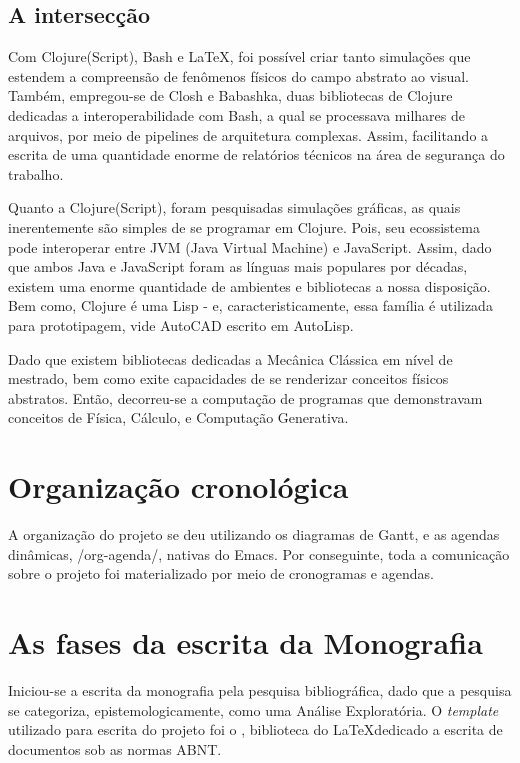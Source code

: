 \documentclass[
12pt,				%
openright,			%
oneside,			%
a4paper,			%
english,			%
french,				%
spanish,			%
brazil,				%
]{abntex2}
\begin{document}
\subsection{A intersecção}

Com Clojure(Script), Bash e \LaTeX{}, foi possível criar tanto
simulações que estendem a compreensão de fenômenos físicos do campo
abstrato ao visual. Também, empregou-se de Closh e Babashka, duas
bibliotecas de Clojure dedicadas a interoperabilidade com Bash, a qual
se processava milhares de arquivos, por meio de pipelines de
arquitetura complexas. Assim, facilitando a escrita de uma quantidade
enorme de relatórios técnicos na área de segurança do trabalho. 

Quanto a Clojure(Script), foram pesquisadas simulações gráficas, as
quais inerentemente são simples de se programar em Clojure. Pois, seu
ecossistema pode interoperar entre JVM (Java Virtual Machine) e
JavaScript. Assim, dado que ambos Java e JavaScript foram as línguas
mais populares por décadas, existem uma enorme quantidade de ambientes
e bibliotecas a nossa disposição. Bem como, Clojure é uma Lisp - e,
caracteristicamente, essa família é utilizada para prototipagem, vide
AutoCAD escrito em AutoLisp.

Dado que existem bibliotecas dedicadas a Mecânica Clássica em nível de
mestrado, bem como exite capacidades de se renderizar conceitos
físicos abstratos. Então, decorreu-se a computação de programas que
demonstravam conceitos de Física, Cálculo, e Computação Generativa.


\section{Organização cronológica}

A organização do projeto se deu utilizando os diagramas de Gantt, e as
agendas dinâmicas, /org-agenda/, nativas do Emacs. Por conseguinte,
toda a comunicação sobre o projeto foi materializado por meio de
cronogramas e agendas.

\section{As fases da escrita da Monografia}
Iniciou-se a escrita da monografia pela pesquisa bibliográfica, dado
que a pesquisa se categoriza, epistemologicamente, como uma Análise
Exploratória. O \textit{template} utilizado para escrita do projeto
foi o \abnTeX{}, biblioteca do \LaTeX dedicado a escrita de documentos sob as normas ABNT.
\end{document}
